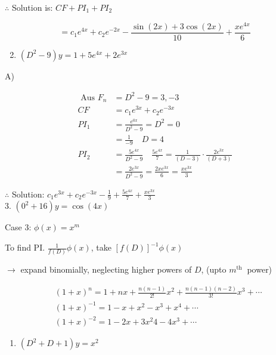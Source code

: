 \documentclass[12pt, a4paper]{article}
\begin{document}
	$\therefore$ Solution is: $C F+P I_{1}+P I_{2}$

$$
=c_{1} e^{4 x}+c_{2} e^{-2 x}-\frac{\sin(2 x)+3 \cos(2 x)}{10}+\frac{x e^{4 x}}{6}
$$

	\begin{enumerate}
		\setcounter{enumi}{1}
		\item $\left(D^{2}-9\right) y=1+5 e^{4 x}+2 e^{3 x}$
	\end{enumerate}

	A)

$$
\begin{aligned}
	\text{ Aus } F_{n} & =D^{2}-9=3,-3                                                                                      \\
	C F                & =c_{1} e^{3 x}+c_{2} e^{-3 x}                                                                      \\
	P I_{1}            & =\frac{e^{0 x}}{D^{2}-9}=D^{2}=0                                                                   \\
	                   & =\frac{1}{-9} \quad D=4                                                                            \\
	P I_{2}            & =\frac{5 e^{4 x}}{D^{2}-9} \quad \frac{5 e^{4 x}}{7}=\frac{1}{(D-3)} \cdot \frac{2 e^{3 x}}{(D+3)} \\
	                   & =\frac{2 e^{3 x}}{D^{2}-9}=\frac{2 x e^{3 x}}{6}=\frac{x e^{3 x}}{3}
\end{aligned}
$$

	$\therefore$ Solution: $c_{1} e^{3 x}+c_{2} e^{-3 x}-\frac{1}{9}+\frac{5 e^{4 x}}{7}+\frac{x e^{3 x}}{3}$\\
	3. $\left(0^{2}+16\right) y=\cos(4 x)$

	Case 3: $\phi(x)=x^{m}$

	To find PI. $\frac{1}{f(D)} \phi(x)$, take $[f(D)]^{-1} \phi(x)$

	$\rightarrow$ expand binomially, neglecting higher powers of $D$, (upto $m^{\text{th }}$ power)

$$
\begin{aligned}
	 & (1+x)^{n}=1+n x+\frac{n(n-1)}{2!} x^2 +\frac{n(n-1)(n-2)}{3!} x^{3}+\cdots \\
	 & (1+x)^{-1}=1-x+x^2 -x^{3}+x^{4}+\cdots                                     \\
	 & (1+x)^{-2}=1-2 x+3 x^2 4-4 x^{3}+\cdots
\end{aligned}
$$

	\begin{enumerate}
		\item $\left(D^{2}+D+1\right) y=x^2 $
	\end{enumerate}
\end{document}
